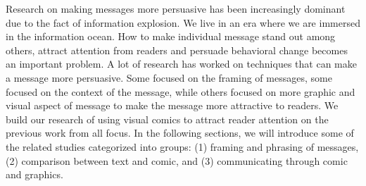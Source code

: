 
Research on making messages more persuasive has been increasingly dominant due to the fact of information explosion. We live in an era where we are immersed in the information ocean. How to make individual message stand out among others, attract attention from readers and persuade behavioral change becomes an important problem. A lot of research has worked on techniques that can make a message more persuasive. Some focused on the framing of messages, some focused on the context of the message, while others focused on more graphic and visual aspect of message to make the message more attractive to readers. We build our research of using visual comics to attract reader attention on the previous work from all focus. In the following sections, we will introduce some of the related studies categorized into groups: (1) framing and phrasing of messages, (2) comparison between text and comic, and (3) communicating through comic and graphics.\par

